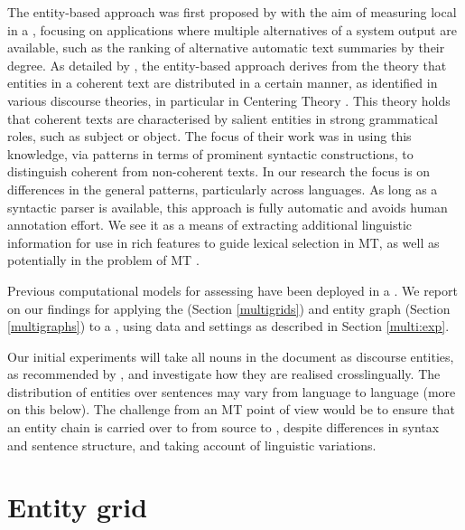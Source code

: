 \documentclass[output=paper]{langsci/langscibook.cls}
\begin{document}
The entity-based approach was first proposed by \citet{barzilay-lapata:2005:ACL} with the aim of measuring local  in a , focusing on applications where multiple alternatives of a system output are available, such as the ranking of alternative automatic text summaries by their  degree. 
As detailed by \citet{Barzilay:2008}, the entity-based approach derives from the theory that entities in a coherent text are distributed in a certain manner, as identified in various discourse theories, in particular in Centering Theory \citep{Grosz:1995}. This theory holds that coherent texts are characterised by salient entities in strong grammatical roles, such as subject or object.
The focus of their work \citep{Barzilay:2008} was in using this knowledge, via patterns in terms of prominent syntactic constructions, to distinguish coherent from non-coherent texts. In our research the focus is on differences in the general patterns, particularly across languages.
As long as a syntactic parser is available, this approach is fully automatic and avoids human annotation effort. We see it as a means of extracting additional linguistic information for use in rich features to guide lexical selection in MT, as well as potentially in the problem of MT . 

Previous computational models for assessing  have been deployed in a  \citep{Lapata:2005,Barzilay:2008,Elsner:2007,Elsner:2011,Burstein,Guinaudeau}. We report on our findings for applying the  (Section  \ref{multigrids}) and entity graph (Section \ref{multigraphs}) to a , using data and settings as described in Section \ref{multi:exp}.

Our initial experiments will take all nouns in the document as discourse entities, as recommended by \citet{Elsner:2011}, and investigate how they are realised crosslingually.
The distribution of entities over sentences may vary from language to language (more on this below). The challenge from an MT point of view would be to ensure that an entity chain is carried over to from source to , despite differences in syntax and sentence structure, and taking account of linguistic variations.
 
\section{Entity grid}\label{entity_grid}
\end{document}
